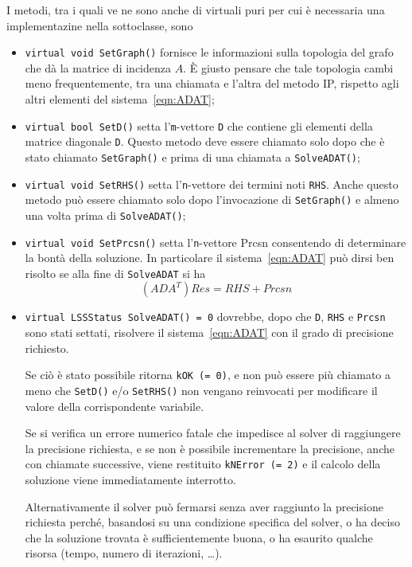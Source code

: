 I metodi, tra i quali ve ne sono anche di virtuali puri per cui è necessaria una implementazine nella sottoclasse, sono
\begin{itemize}
\item \texttt{virtual void SetGraph()} fornisce le informazioni sulla topologia del grafo che dà la matrice di incidenza $A$. È giusto pensare che tale topologia cambi meno frequentemente, tra una chiamata e l'altra del metodo IP, rispetto agli altri elementi del sistema~\eqref{eqn:ADAT};

\item \texttt{virtual bool SetD()} setta l'\texttt{m}-vettore \texttt{D} che contiene gli elementi della matrice diagonale \texttt{D}. Questo metodo deve essere chiamato solo dopo che è stato chiamato \texttt{SetGraph()} e prima di una chiamata a \texttt{SolveADAT()};

\item \texttt{virtual void SetRHS()} setta l'\texttt{n}-vettore dei termini noti \texttt{RHS}. Anche questo metodo può essere chiamato solo dopo l'invocazione di \texttt{SetGraph()} e almeno una volta prima di \texttt{SolveADAT()};

\item \texttt{virtual void SetPrcsn()} setta l'\texttt{n}-vettore Prcsn consentendo di determinare la bontà della soluzione. In particolare il sistema~\eqref{eqn:ADAT} può dirsi ben risolto se alla fine di \texttt{SolveADAT} si ha
\begin{equation*}
(ADA^T)Res = RHS+Prcsn
\end{equation*}

\item \texttt{virtual LSSStatus SolveADAT() = 0} dovrebbe, dopo che \texttt{D}, \texttt{RHS} e \texttt{Prcsn} sono stati settati, risolvere il sistema~\eqref{eqn:ADAT} con il grado di precisione richiesto.

Se ciò è stato possibile ritorna \texttt{kOK (= 0)}, e non può essere più chiamato a meno che \texttt{SetD()} e/o \texttt{SetRHS()} non vengano reinvocati per modificare il valore della corrispondente variabile.

Se si verifica un errore numerico fatale che impedisce al solver di raggiungere la precisione richiesta, e se non è possibile incrementare la precisione, anche con chiamate successive, viene restituito \texttt{kNError (= 2)} e il calcolo della soluzione viene immediatamente interrotto.

Alternativamente il solver può fermarsi senza aver raggiunto la precisione richiesta perché, basandosi su una condizione specifica del solver, o ha deciso che la soluzione trovata è sufficientemente buona, o ha esaurito qualche risorsa (tempo, numero di iterazioni, \dots).


\end{itemize}
